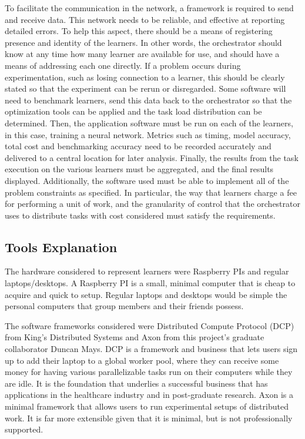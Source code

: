 \documentclass[../mthe-493-final-project.tex]{subfiles}
\begin{document}
    To facilitate the communication in the network, a framework is required to send and receive data. This network needs to be reliable, and effective at reporting detailed errors. To help this aspect, there should be a means of registering presence and identity of the learners. In other words, the orchestrator should know at any time how many learner are available for use, and should have a means of addressing each one directly. If a problem occurs during experimentation, such as losing connection to a learner, this should be clearly stated so that the experiment can be rerun or disregarded. Some software will need to benchmark learners, send this data back to the orchestrator so that the optimization tools can be applied and the task load distribution can be determined. Then, the application software must be run on each of the learners, in this case, training a neural network. Metrics such as timing, model accuracy, total cost and benchmarking accuracy need to be recorded accurately and delivered to a central location for later analysis. Finally, the results from the task execution on the various learners must be aggregated, and the final results displayed. Additionally, the software used must be able to implement all of the problem constraints as specified. In particular, the way that learners charge a fee for performing a unit of work, and the granularity of control that the orchestrator uses to distribute tasks with cost considered must satisfy the requirements. 
    
    \subsection{Tools Explanation}
    The hardware considered to represent learners were Raspberry PIs and regular laptops/desktops. A Raspberry PI is a small, minimal computer that is cheap to acquire and quick to setup. Regular laptops and desktops would be simple the personal computers that group members and their friends possess. 
    
    The software frameworks considered were Distributed Compute Protocol (DCP) from King's Distributed Systems and Axon from this project's graduate collaborator Duncan Mays. DCP is a framework and business that lets users sign up to add their laptop to a global worker pool, where they can receive some money for having various parallelizable tasks run on their computers while they are idle. It is the foundation that underlies a successful business that has applications in the healthcare industry and in post-graduate research. Axon is a minimal framework that allows users to run experimental setups of distributed work. It is far more extensible given that it is minimal, but is not professionally supported.
\end{document}
